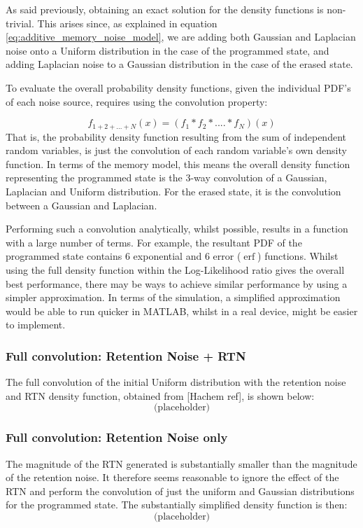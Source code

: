 \documentclass[11pt]{article}
\numberwithin{equation}{subsection}
\DeclareMathOperator\erf{erf}
\begin{document}
As said previously, obtaining an exact solution for the density functions is non-trivial. This arises since, as explained in equation \ref{eq:additive_memory_noise_model}, we are adding both Gaussian and Laplacian noise onto a Uniform distribution in the case of the programmed state, and adding Laplacian noise to a Gaussian distribution in the case of the erased state.

To evaluate the overall probability density functions, given the individual PDF's of each noise source, requires using the convolution property:

\begin{equation}
f_{1+2+...+N}(x) = (f_1 \ast f_2 \ast .... \ast f_N)(x)
\end{equation}
That is, the probability density function resulting from the sum of independent random variables, is just the convolution of each random variable's own density function. In terms of the memory model, this means the overall density function representing the programmed state is the 3-way convolution of a Gaussian, Laplacian and Uniform distribution. For the erased state, it is the convolution between a Gaussian and Laplacian. 

Performing such a convolution analytically, whilst possible, results in a function with a large number of terms. For example, the resultant PDF of the programmed state contains 6 exponential and 6 error ($\erf$) functions. Whilst using the full density function within the Log-Likelihood ratio gives the overall best performance, there may be ways to achieve similar performance by using a simpler approximation. In terms of the simulation, a simplified approximation would be able to run quicker in MATLAB, whilst in a real device, might be easier to implement. 

\subsubsection{Full convolution: Retention Noise + RTN}
The full convolution of the initial Uniform distribution with the retention noise and RTN density function, obtained from [Hachem ref], is shown below:
\begin{equation}
\text{(placeholder)}
\end{equation}

\subsubsection{Full convolution: Retention Noise only}
The magnitude of the RTN generated is substantially smaller than the magnitude of the retention noise. It therefore seems reasonable to ignore the effect of the RTN and perform the convolution of just the uniform and Gaussian distributions for the programmed state. The substantially simplified density function is then:
\begin{equation}
\text{(placeholder)}
\end{equation}
\end{document}
